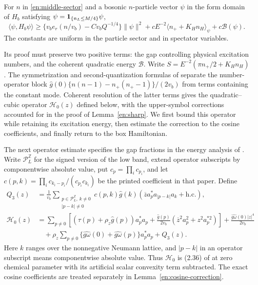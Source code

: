 \begin{lemma}\label{en:sharp}
For $n$ in \eqref{en:middle-sector} and a bosonic $n$-particle
vector $\psi$ in the form domain of $H_b$ satisfying
$\psi=\mathbf 1_{\{n_L\le M/4\}}\psi$,
\begin{equation}\label{en:sharp-bound}
 \langle\psi,H_b\psi\rangle
 \ge\{v_be_r(n/v_b)-Cv_bQ^{-1/4}\}\|\psi\|^2
       +cE^{-2}\langle n_++K_Hn_H\rangle_\psi
       +c\mathcal B(\psi).
\end{equation}
The constants are uniform in the particle sector and in spectator
variables.
\end{lemma}

Its proof must preserve two positive terms: the gap controlling physical
excitation numbers, and the coherent quadratic energy $\mathcal B$.
Write $S=E^{-2}(\pi n_+/2+K_Hn_H)$.  The symmetrization and
second-quantization formulas of \cite[Theorem~2.6 and Lemma~2.8]{FJGMOT}
separate the number-operator block
$\widehat g(0)\{n(n-1)-n_+(n_+-1)\}/(2v_b)$ from terms containing
the constant mode.  Coherent resolution of the latter terms gives the
quadratic--cubic operator $\mathcal H_0(z)$ defined below, with the
upper-symbol corrections accounted for in the proof of
Lemma~\ref{en:sharp}.  We first bound this operator while retaining
its excitation energy, then estimate the correction to the cosine
coefficients, and finally return to the box Hamiltonian.

The next operator estimate specifies the gap fractions in the energy
analysis of \cite{FJGMOT}.
Write $\mathcal P_L^{\mathbb Z}$ for the signed version of the low band,
extend operator subscripts by componentwise absolute value, put
$c_p=\prod_i c_{p_i}$, and let
$c(p,k)=\prod_i c_{k_i-p_i}/(c_{p_i}c_{k_i})$ be the printed coefficient
in that paper.  Define
\begin{align}
 Q_3(z)&=\frac1{v_b}\sum_{\substack{p\in\mathcal P_L^{\mathbb Z},\ k\ne0\\
                                      |p-k|\ne0}}
 c(p,k)\widehat g(k)(\overline z a_p^*a_{|p-k|}a_k+\mathrm{h.c.}),
                                                        \label{en:printed-cubic}\\
 \mathcal H_0(z)&=\sum_{p\ne0}\left[
   (\tau(p)+\rho_z\widehat g(p))a_p^*a_p
   +\frac{\widehat g(p)}{2v_b}
      (\overline z^2a_p^2+z^2a_p^{*2})\right]
   +\frac{\widehat{g\omega}(0)|z|^4}{2v_b}\nonumber\\
 &\quad+\rho_z\sum_{p\ne0}
       \{\widehat{g\omega}(0)+\widehat{g\omega}(p)\}a_p^*a_p+Q_3(z).
                                                        \label{en:H0}
\end{align}
Here $k$ ranges over the nonnegative Neumann lattice, and $|p-k|$ in
an operator subscript means componentwise absolute value.
Thus $\mathcal H_0$ is (2.36) of \cite{FJGMOT} at zero chemical
parameter with its artificial scalar convexity term subtracted.
The exact cosine coefficients are treated separately in
Lemma~\ref{en:cosine-correction}.

